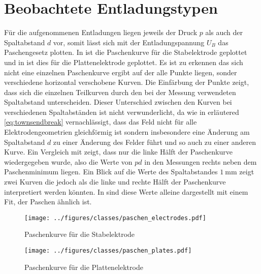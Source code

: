 \section{Beobachtete Entladungstypen}
Für die aufgenommenen Entladungen liegen jeweils der Druck \(p\) als auch der Spaltabstand \(d\) vor, somit lässt sich mit der Entladungspannung \(U_B\) das Paschengesetz plotten. In  ist die Paschenkurve für die Stabelektrode geplottet und in  ist dies für die Plattenelektrode geplottet. Es ist zu erkennen das sich nicht eine einzelnen Paschenkurve ergibt auf der alle Punkte liegen, sonder verschiedene horizontal verschobene Kurven. Die Einfärbung der Punkte zeigt, dass sich die einzelnen Teilkurven durch den bei der Messung verwendeten Spaltabstand unterscheiden. Dieser Unterschied zwischen den Kurven bei verschiedenen Spaltabständen ist nicht verwunderlicht, da wie in  erläutered \eqref{eq:townsendbreak} vernachlässigt, dass das Feld nicht für alle Elektrodengeometrien gleichförmig ist sondern insbesondere eine Änderung am Spaltabstand \(d\) zu einer Änderung des Felder führt und so auch zu einer anderen Kurve. Ein Vergleich mit  zeigt, dass nur die linke Hälft der Paschenkurve wiedergegeben wurde, also die Werte von \(pd\) in den Messungen rechts neben dem Paschenminimum liegen. Ein Blick auf die Werte des Spaltabstandes \(\SI{1}{\milli\meter}\) zeigt zwei Kurven die jedoch als die linke und rechte Hälft der Paschenkurve interpretiert werden könnten. In  sind diese Werte alleine dargestellt mit einem Fit, der Paschen ähnlich ist.

  \begin{figure}[H]
    \centering
    \texttt{[image: ../figures/classes/paschen\_electrodes.pdf]}
    \caption{Paschenkurve für die Stabelektrode}
    \label{fig:paschencurvestab}
  \end{figure}

  \begin{figure}[H]
    \centering
    \texttt{[image: ../figures/classes/paschen\_plates.pdf]}
    \caption{Paschenkurve für die Plattenelektrode}
    \label{fig:paschencurveplate}
  \end{figure}

